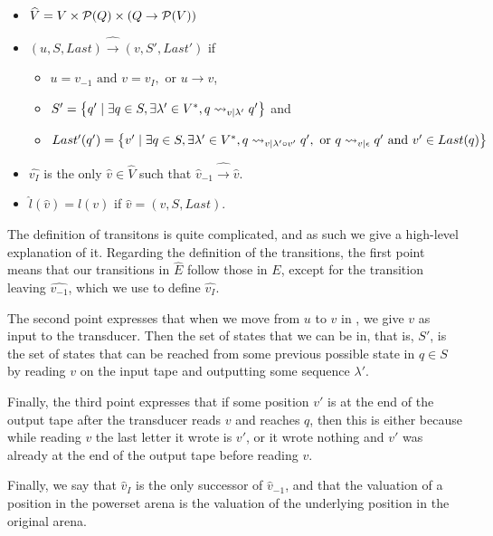 \documentclass[12pt, a4paper]{article}
\begin{document}
\begin{itemize}
\item $\widehat{V} = V \times \mathcal{P}(Q) \times (Q \rightarrow \mathcal{P}(V))$
\item $(u, S, Last) \widehat{\rightarrow} (v, S', Last')$ if
  \begin{itemize}
  \item $u = v_{-1} \text{ and } v = v_I, \text{ or } u \rightarrow v$,
  \item $S' = \left\{q' \mid \exists q \in S, \exists \lambda' \in V^\ast, q
      \rightsquigarrow_{v \mid \lambda'} q' \right\}$ and
  \item $Last' (q') = \left\{ v' \mid \exists q \in S, \exists \lambda' \in
      V^\ast, q \rightsquigarrow_{v \mid \lambda' \circ v'} q', \text{ or } q \rightsquigarrow_{v \mid
        \epsilon} q' \text{ and } v' \in Last(q) \right\}$
  \end{itemize}
\item $\widehat{v_I}$ is the only $\widehat{v} \in \widehat{V}$ such that
  $\widehat{v}_{-1} \widehat{\rightarrow} \widehat{v}$.
\item $\widehat{l}(\widehat{v}) = l (v)$ if $\widehat{v}= (v, S, Last)$. 
\end{itemize}

The definition of transitons is quite complicated, and as such we give a high-level
explanation of it. Regarding the definition of the transitions,
the first point means that our transitions in $\widehat{E}$ follow those in $E$,
except for the transition leaving $\widehat{v_{-1}}$, which we use to define
$\widehat{v_I}$. 

The second point expresses that when we move from $u$ to $v$ in , we give
$v$ as input to the transducer. Then the set of states that we can be in, that
is, $S'$, is the set of states that can be reached from some previous possible
state in $q \in S$ by reading $v$ on the input tape and outputting some sequence
$\lambda'$.

Finally, the third point expresses that if some position $v'$ is at the end of
the output tape after the transducer reads $v$ and reaches $q$, then this is either
because while reading $v$ the last letter it wrote is $v'$, or it wrote nothing
and $v'$ was already at the end of the output tape before reading $v$. 

Finally, we say that $\widehat{v}_I$ is the only successor of
$\widehat{v}_{-1}$, and that the valuation of a position in the powerset arena
is the valuation of the underlying position in the original arena. 
\end{document}
